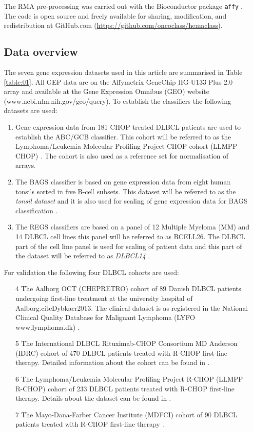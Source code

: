 \documentclass{article}
\begin{document}
The RMA pre-processing was carried out with the Bioconductor package \texttt{affy} \citep{Gautier2004}.
The code is open source and freely available for sharing, modification, and redistribution at GitHub.com (\url{https://github.com/oncoclass/hemaclass}).

\subsection{Data overview}
The seven gene expression datasets used in this article are summarised in Table \ref{table:01}.
All GEP data are on the Affymetrix GeneChip HG-U133 Plus 2.0 array and available at the Gene Expression Omnibus (GEO) website (www.ncbi.nlm.nih.gov/geo/query).
To establish the classifiers the following datasets are used:
\begin{enumerate}
  \item Gene expression data from 181 CHOP treated DLBCL patients are used to establish the ABC/GCB classifier.
  This cohort will be referred to as the Lymphoma/Leukemia Molecular Profiling Project CHOP cohort (LLMPP CHOP) \citep{Lenz2008a}.
  The cohort is also used as a reference set for normalisation of arrays.
  \item The BAGS classifier is based on gene expression data from eight human tonsils sorted in five B-cell subsets.
  This dataset will be referred to as the \textit{tonsil dataset} and it is also used for scaling of gene expression data for BAGS classification \citep{Dybkaer2013}.
  \item The REGS classifiers are based on a panel of 12 Multiple Myeloma (MM) and 14 DLBCL cell lines this panel will be referred to as BCELL26.
  The DLBCL part of the cell line panel is used for scaling of patient data and this part of the dataset will be referred to as \textit{DLBCL14} \citep{Falgreen2013c}.
\end{enumerate}
For validation the following four DLBCL cohorts are used:
\begin{enumerate}
  \item[4] The Aalborg OCT (CHEPRETRO) cohort of 89 Danish DLBCL patients undergoing first-line treatment at the university  hospital of Aalborg.cite{Dybkaer2013}.
  The clinical dataset is as registered in the National Clinical Quality Database for Malignant Lymphoma (LYFO www.lymphoma.dk) \citep{Gang2012}.
  \item[5] The International DLBCL Rituximab-CHOP Consortium MD Anderson (IDRC) cohort of 470 DLBCL patients treated with R-CHOP first-line therapy.
  Detailed information about the cohort can be found in \citep{Visco2012}.
  \item[6] The Lymphoma/Leukemia Molecular Profiling Project R-CHOP (LLMPP R-CHOP) cohort of 233 DLBCL patients treated with R-CHOP first-line therapy.
  Details about the dataset can be found in \citep{Lenz2008a}.
  \item[7] The Mayo-Dana-Farber Cancer Institute (MDFCI) cohort of 90 DLBCL patients treated with R-CHOP first-line therapy \citep{Monti2012a}.
\end{enumerate}
\end{document}
